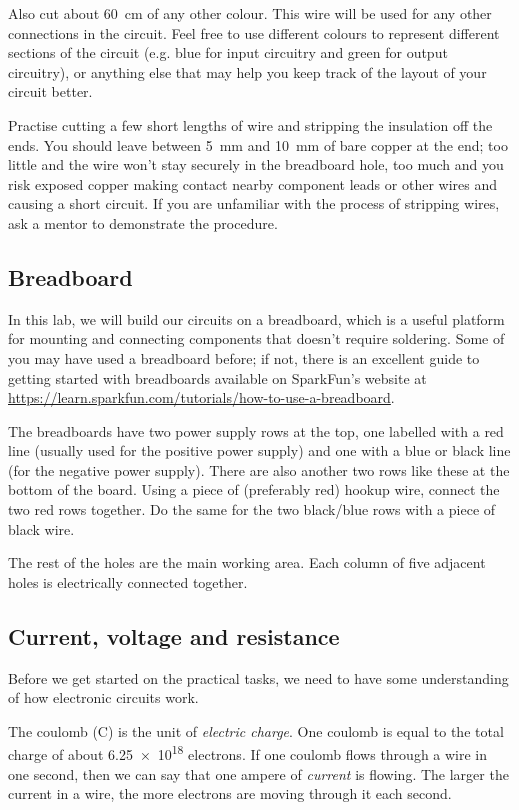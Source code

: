 \documentclass{article}
\begin{document}
Also cut about \SI{60}{\centi\metre} of any other colour. This wire will be used
for any other connections in the circuit. Feel free to use different colours to
represent different sections of the circuit (e.g. blue for input circuitry and
green for output circuitry), or anything else that may help you keep track of
the layout of your circuit better.

Practise cutting a few short lengths of wire and stripping the insulation off
the ends. You should leave between \SI{5}{\milli\metre} and
\SI{10}{\milli\metre} of bare copper at the end; too little and the wire won't
stay securely in the breadboard hole, too much and you risk exposed copper
making contact nearby component leads or other wires and causing a short
circuit. If you are unfamiliar with the process of stripping wires, ask a
mentor to demonstrate the procedure.

\subsection{Breadboard}

In this lab, we will build our circuits on a breadboard, which is a useful
platform for mounting and connecting components that doesn't require soldering.
Some of you may have used a breadboard before; if not, there is an excellent
guide to getting started with breadboards available on SparkFun's website at
\url{https://learn.sparkfun.com/tutorials/how-to-use-a-breadboard}.

The breadboards have two power supply rows at the top, one labelled with
a red line (usually used for the positive power supply) and one with a blue or
black line (for the negative power supply). There are also another two
rows like these at the bottom of the board. Using a piece of (preferably red)
hookup wire, connect the two red rows together. Do the same for the two
black/blue rows with a piece of black wire.

The rest of the holes are the main working area. Each column of five adjacent
holes is electrically connected together.

\subsection{Current, voltage and resistance}

Before we get started on the practical tasks, we need to have some understanding
of how electronic circuits work.

The coulomb (\si{\coulomb}) is the unit of \emph{electric charge}. One coulomb
is equal to the total charge of about \num{6.25e18} electrons. If one coulomb
flows through a wire in one second, then we can say that one ampere of
\emph{current} is flowing. The larger the current in a wire, the more electrons
are moving through it each second.
\end{document}
